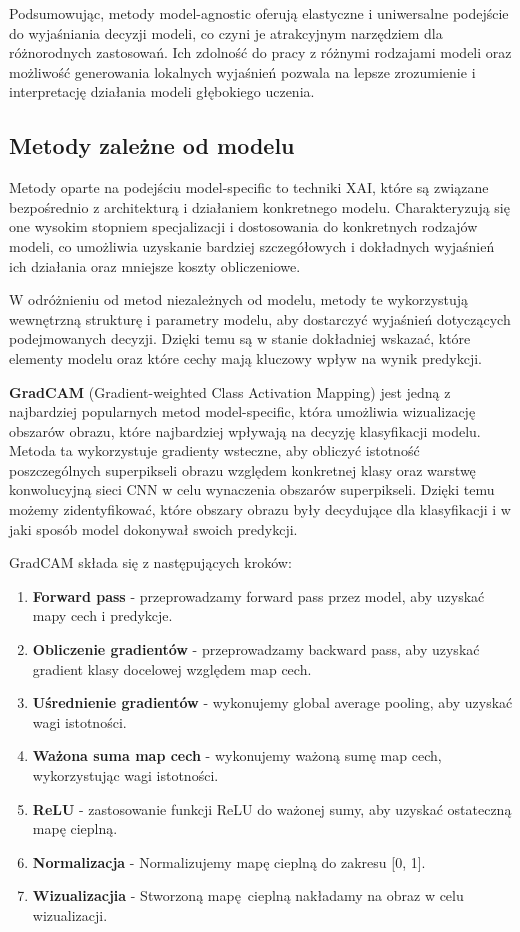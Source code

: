 \vspace{1cm}
Podsumowując, metody model-agnostic oferują elastyczne i uniwersalne podejście do wyjaśniania decyzji modeli, co czyni je atrakcyjnym narzędziem dla różnorodnych zastosowań.
Ich zdolność do pracy z różnymi rodzajami modeli oraz możliwość generowania lokalnych wyjaśnień pozwala na lepsze zrozumienie i interpretację działania modeli głębokiego uczenia.

\subsection*{Metody zależne od modelu}
Metody oparte na podejściu model-specific to techniki XAI, które są związane bezpośrednio z architekturą i działaniem konkretnego modelu.
Charakteryzują się one wysokim stopniem specjalizacji i dostosowania do konkretnych rodzajów modeli, co umożliwia uzyskanie bardziej szczegółowych i dokładnych wyjaśnień ich działania oraz mniejsze koszty obliczeniowe.

W odróżnieniu od metod niezależnych od modelu, metody te wykorzystują wewnętrzną strukturę i parametry modelu, aby dostarczyć wyjaśnień dotyczących podejmowanych decyzji.
Dzięki temu są w stanie dokładniej wskazać, które elementy modelu oraz które cechy mają kluczowy wpływ na wynik predykcji.

\textbf{GradCAM} \cite{Selvaraju_2019} (Gradient-weighted Class Activation Mapping) jest jedną z najbardziej popularnych metod model-specific, która umożliwia wizualizację obszarów obrazu, które najbardziej wpływają na decyzję klasyfikacji modelu.
Metoda ta wykorzystuje gradienty wsteczne, aby obliczyć istotność poszczególnych superpikseli obrazu względem konkretnej klasy oraz warstwę konwolucyjną sieci CNN w celu wynaczenia obszarów superpikseli.
Dzięki temu możemy zidentyfikować, które obszary obrazu były decydujące dla klasyfikacji i w jaki sposób model dokonywał swoich predykcji.

GradCAM składa się z następujących kroków:
\begin{enumerate}
	\item \textbf{Forward pass} - przeprowadzamy forward pass przez model, aby uzyskać mapy cech i predykcje.
	\item \textbf{Obliczenie gradientów} - przeprowadzamy backward pass, aby uzyskać gradient klasy docelowej względem map cech.
	\item \textbf{Uśrednienie gradientów} - wykonujemy global average pooling, aby uzyskać wagi istotności.
	\item \textbf{Ważona suma map cech} - wykonujemy ważoną sumę map cech, wykorzystując wagi istotności.
	\item \textbf{ReLU} - zastosowanie funkcji ReLU do ważonej sumy, aby uzyskać ostateczną mapę cieplną.
	\item \textbf{Normalizacja} - Normalizujemy mapę cieplną do zakresu [0, 1].
  \item \textbf{Wizualizacjia} - Stworzoną mapę cieplną nakładamy na obraz w celu wizualizacji.
\end{enumerate}

